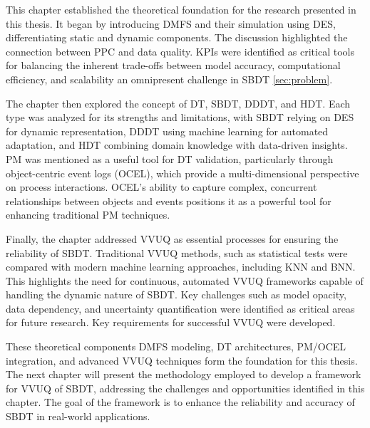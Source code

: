 This chapter established the theoretical foundation for the research presented in this thesis. It began by introducing DMFS and their simulation using DES, differentiating static and dynamic components. The discussion highlighted the connection between PPC and data quality. KPIs were identified as critical tools for balancing the inherent trade-offs between model accuracy, computational efficiency, and scalability \textemdash an omnipresent challenge in SBDT \autoref{sec:problem}.

The chapter then explored the concept of DT, SBDT, DDDT, and HDT. Each type was analyzed for its strengths and limitations, with SBDT relying on DES for dynamic representation, DDDT using machine learning for automated adaptation, and HDT combining domain knowledge with data-driven insights. PM was mentioned as a useful tool for DT validation, particularly through object-centric event logs (OCEL), which provide a multi-dimensional perspective on process interactions. OCEL’s ability to capture complex, concurrent relationships between objects and events positions it as a powerful tool for enhancing traditional PM techniques.

Finally, the chapter addressed VVUQ as essential processes for ensuring the reliability of SBDT. Traditional VVUQ methods, such as statistical tests were compared with modern machine learning approaches, including KNN and BNN. This highlights the need for continuous, automated VVUQ frameworks capable of handling the dynamic nature of SBDT. Key challenges such as model opacity, data dependency, and uncertainty quantification were identified as critical areas for future research. Key requirements for successful VVUQ were developed.

These theoretical components \textemdash DMFS modeling, DT architectures, PM/OCEL integration, and advanced VVUQ techniques \textemdash form the foundation for this thesis. The next chapter will present the methodology employed to develop a framework for VVUQ of SBDT, addressing the challenges and opportunities identified in this chapter. The goal of the framework is to enhance the reliability and accuracy of SBDT in real-world applications.




